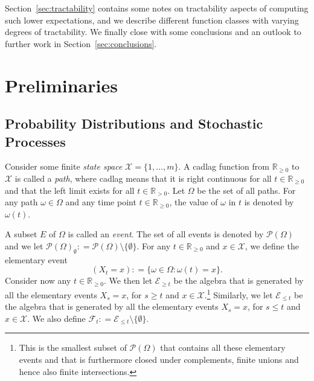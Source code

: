 \documentclass[10pt]{paper}
\newcommand{\reals}{\mathbb{R}}
\newcommand{\realspos}{\reals_{>0}}
\newcommand{\realsnonneg}{\reals_{\geq 0}}
\newcommand{\states}{\mathcal{X}}
\newcommand{\paths}{\Omega}
\newcommand{\path}{\omega}
\newcommand{\power}{\mathcal{P}(\paths)}
\newcommand{\nonemptypower}{\power_{\emptyset}}
\newcommand{\events}{\mathcal{E}}
\newcommand{\filter}[1][t]{\mathcal{F}_{#1}}
\newcommand{\coloneqq}{:\!=}
\begin{document}
Section~\ref{sec:tractability} contains some notes on tractability aspects of  computing such lower expectations, and we describe different function classes with varying degrees of tractability. We finally close with some conclusions and an outlook to further work in Section~\ref{sec:conclusions}.

\section{Preliminaries}\label{sec:prelim}

\subsection{Probability Distributions and Stochastic Processes}
Consider some finite \emph{state space} $\states=\{1,\dots,m\}$. A cadlag function from $\realsnonneg$ to $\states$ is called a \emph{path}, where cadlag means that it is right continuous for all $t\in\realsnonneg$ and that the left limit exists for all $t\in\realspos$. Let $\paths$ be the set of all paths. For any path $\path\in\paths$ and any time point $t\in\realsnonneg$, the value of $\path$ in $t$ is denoted by $\path(t)$.

A subset $E$ of $\paths$ is called an \emph{event}. The set of all events is denoted by $\power$ and we let $\nonemptypower\coloneqq\power\setminus\{\emptyset\}$. For any $t\in\realsnonneg$ and $x\in\states$, we define the elementary event
\begin{equation*}
(X_t=x)\coloneqq\{\path\in\paths\colon\path(t)=x\}.
\end{equation*}
Consider now any $t\in\realsnonneg$. We then let $\events_{\geq t}$ be the algebra that is generated by all the elementary events $X_s=x$, for $s\geq t$ and $x\in\states$.\footnote{This is the smallest subset of $\power$ that contains all these elementary events and that is furthermore closed under complements, finite unions and hence also finite intersections.} Similarly, we let $\events_{\leq t}$ be the algebra that is generated by all the elementary events $X_s=x$, for $s\leq t$ and $x\in\states$. We also define $\filter\coloneqq\events_{\leq t}\setminus\{\emptyset\}$.
\end{document}
